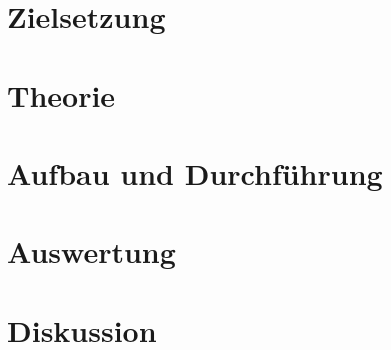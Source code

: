 

\setlength{\parindent}{0em}


%
%

\tableofcontents
\newpage

\section{Zielsetzung}



\section{Theorie}

\newpage



\section{Aufbau und Durchführung}

\newpage

\section{Auswertung}

\newpage

\newpage
\section{Diskussion}

\newpage


%

